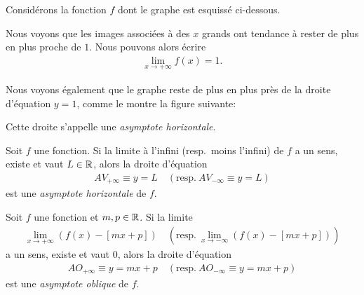 \documentclass[main.tex]{subfiles}
\begin{document}
\begin{example}

    Considérons la fonction $f$ dont le graphe est esquissé ci-dessous.
    \begin{center}
        \begin{plot}{0.25}{-1}{-3}{30}{5}
        \end{plot}
    \end{center}

    Nous voyons que les images associées à des $x$ grands ont tendance à rester de plus en plus proche de $1$.
    Nous pouvons alors écrire
    \begin{align*}
        \lim_{x \to +\infty} f(x) = 1.
    \end{align*}

    Nous voyons également que le graphe reste de plus en plus près de la droite d'équation $y = 1$,
    comme le montre la figure suivante:
    \begin{center}
        \begin{plot}{0.25}{-1}{-3}{30}{5}
        \end{plot}
    \end{center}

    Cette droite s'appelle une \emph{asymptote horizontale}.
\end{example}

\begin{definition}

    Soit $f$ une fonction.
    Si la limite à l'infini (resp.\ moins l'infini) de $f$ a un sens, existe et vaut $L \in \mathbb{R}$,
    alors la droite d'équation
    \begin{align}
        AV_{+\infty} \equiv y = L
        \quad
        \left(\text{resp.}\ AV_{-\infty} \equiv y = L\right)
    \end{align}
    est une \emph{asymptote horizontale} de $f$.
\end{definition}

\begin{definition}

    Soit $f$ une fonction et $m, p \in \mathbb{R}$.
    Si la limite
    \begin{align*}
        \lim_{x \to +\infty} \left(f(x) - [mx + p]\right)
        \quad \left(\text{resp.}\ \lim_{x \to -\infty} \left(f(x) - [mx + p]\right)\right)
    \end{align*}
    a un sens, existe et vaut $0$,
    alors la droite d'équation
    \begin{align}
        AO_{+\infty} \equiv y = mx + p
        \quad \left(\text{resp.}\ AO_{-\infty} \equiv y = mx + p\right)
    \end{align}
    est une \emph{asymptote oblique} de $f$.
\end{definition}
\end{document}
